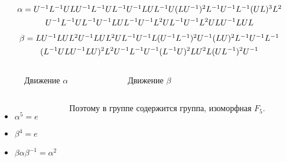 \documentclass[utf8,russian]{beamer}
\begin{document}
\begin{frame}
\begin{multline*} %
$$
\alpha=U^{-1}L^{-1}ULU^{-1}L^{-1}UL^{-1}U^{-1}LUL^{-1}U(LU^{-1})^2L^{-1}U^{-1}L^{-1}(UL)^3L^2 \\
U^{-1}L^{-1}UL^{-1}U^{-1}LUL^{-1}U^{-1}L^2UL^{-1}U^{-1}L^2ULU^{-1}LUL
$$
\end{multline*}
\begin{multline*} %
$$
\beta=LU^{-1}LUL^2U^{-1}LUL^2UL^{-1}U^{-1}L(U^{-1}L^{-1})^2U^{-1}(LU)^2L^{-1}U^{-1}L^{-1}\\ 
(L^{-1}ULU^{-1}LU)^2L^2U^{-1}L^{-1}U^{-1}(L^{-1}U)^2LU^2L(UL^{-1})^2U^{-1}
$$
\end{multline*}
\begin{columns}
	\RubikCubeSolved
	\vspace*{-1cm}
	\begin{figure}[c]
		\caption{Движение $\alpha$}
	\end{figure}
	\RubikCubeSolved
	\vspace*{-1cm}
	\begin{figure}[c]
		\caption{Движение $\beta$}
	\end{figure}
\end{columns}
\begin{columns}
\begin{itemize}
\item $\alpha^5=e$
\item $\beta^4=e$
\item $\beta\alpha\beta^{-1}=\alpha^2$
\end{itemize}
Поэтому в группе содержится группа, изоморфная $F_5$.
\end{columns}
\end{frame}

\end{document}
